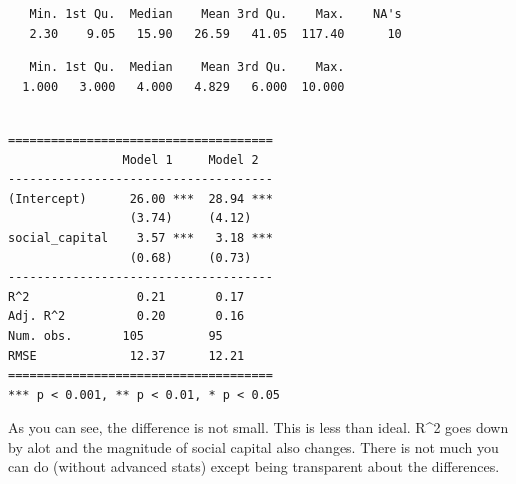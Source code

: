 \documentclass[]{article}
\newenvironment{Shaded}{\begin{snugshade}}{\end{snugshade}}
\newcommand{\KeywordTok}[1]{\textcolor[rgb]{0.13,0.29,0.53}{\textbf{#1}}}
\newcommand{\DataTypeTok}[1]{\textcolor[rgb]{0.13,0.29,0.53}{#1}}
\newcommand{\StringTok}[1]{\textcolor[rgb]{0.31,0.60,0.02}{#1}}
\newcommand{\CommentTok}[1]{\textcolor[rgb]{0.56,0.35,0.01}{\textit{#1}}}
\newcommand{\OperatorTok}[1]{\textcolor[rgb]{0.81,0.36,0.00}{\textbf{#1}}}
\newcommand{\NormalTok}[1]{#1}
\theoremstyle{definition}
\theoremstyle{definition}
\theoremstyle{definition}
\theoremstyle{remark}
\begin{document}
\begin{verbatim}
   Min. 1st Qu.  Median    Mean 3rd Qu.    Max.    NA's 
   2.30    9.05   15.90   26.59   41.05  117.40      10 
\end{verbatim}

\begin{Shaded}
\end{Shaded}

\begin{verbatim}
   Min. 1st Qu.  Median    Mean 3rd Qu.    Max. 
  1.000   3.000   4.000   4.829   6.000  10.000 
\end{verbatim}

\begin{Shaded}
\end{Shaded}

\begin{verbatim}

=====================================
                Model 1     Model 2  
-------------------------------------
(Intercept)      26.00 ***  28.94 ***
                 (3.74)     (4.12)   
social_capital    3.57 ***   3.18 ***
                 (0.68)     (0.73)   
-------------------------------------
R^2               0.21       0.17    
Adj. R^2          0.20       0.16    
Num. obs.       105         95       
RMSE             12.37      12.21    
=====================================
*** p < 0.001, ** p < 0.01, * p < 0.05
\end{verbatim}

As you can see, the difference is not small. This is less than ideal.
R\^{}2 goes down by alot and the magnitude of social capital also
changes. There is not much you can do (without advanced stats) except
being transparent about the differences.
\end{document}
